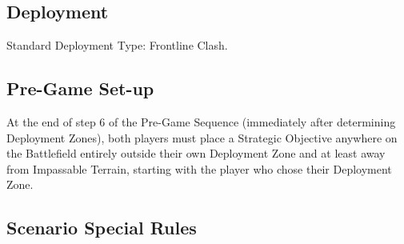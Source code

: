
\label{StrategicObjections}


\subsection*{Deployment}

Standard Deployment Type: Frontline Clash.


\subsection*{Pre-Game Set-up}

At the end of step 6 of the Pre-Game Sequence (immediately after determining Deployment Zones), both players must place a Strategic Objective anywhere on the Battlefield entirely outside their own Deployment Zone and at least  away from Impassable Terrain, starting with the player who chose their Deployment Zone. 

\subsection*{Scenario Special Rules}

\newcommand{\strategicobjective}{Strategic Objective}
\newcommand{\unmovable}{Unmoveable}
\newcommand{\unmovabledef}{%
	The Strategic Objective cannot move in any way once deployed, and for rules purposes its Pursuit and Overrun Distance is always \distance{0}. It cannot be joined by Characters.%
}
\newcommand{\themed}{Themed}
\newcommand{\themeddef}{%
	During step 7 of the Deployment Phase Sequence (after moving Vanguarding units but before rolling for first turn), each player must give their own Strategic Objective 2 upgrades from the list belowstarting with the player who chose their Deployment Zone:
	\begin{itemize}
	\item \magicresistance{4}
	\item \aegis{5+}
	\item \fortitude{4}
	\item Armour \textbf{set} to 4
	\item Toxic Attacks can \textbf{never} wound the model and attacks that are Poison Attacks against the model lose this Attack Attribute
	\item Resilience \textbf{set} to 8
	\item \distracting{}
	\item \hardtarget{} (1)
	\item Health Points \textbf{set} to 9
	\item At the start of each Game Turn, roll a D6. On a 5+, this model Recovers 1 Health Point
	\end{itemize}%
}

